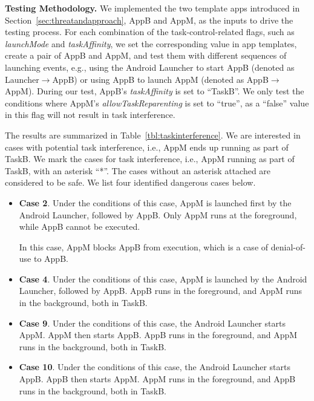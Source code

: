 \documentclass[letterpaper,12pt]{article}
\begin{document}
{\noindent \bf Testing Methodology.} We implemented the two template
apps introduced in Section~\ref{sec:threatandapproach}, AppB and AppM, as the
inputs to drive the testing process.  For each combination of the
task-control-related flags, such as {\em launchMode} and {\em
  taskAffinity}, we set the corresponding value in app templates,
create a pair of AppB and AppM, and test them with different sequences
of launching events, e.g., using the Android Launcher to start AppB
(denoted as Launcher$\rightarrow$AppB) or using AppB to launch AppM
(denoted as AppB$\rightarrow$AppM). During our test, AppB's {\em
  taskAffinity} is set to ``TaskB''.  We only test the conditions
where AppM's {\em allowTaskReparenting} is set to ``true'', as a
``false'' value in this flag will not result in task interference.

The results are summarized in Table~\ref{tbl:taskinterference}.  We
are interested in cases with potential task interference, i.e., AppM
ends up running as part of TaskB.  We mark the cases for task
interference, i.e., AppM running as part of TaskB, with an asterisk
``*''. The cases without an asterisk attached are considered to be
safe. We list four identified dangerous cases below.

\begin{itemize}
  \item {\bf Case 2}. Under the conditions of this case, AppM is
    launched first by the Android Launcher, followed by AppB. Only
    AppM runs at the foreground, while AppB cannot be executed.

    In this case, AppM blocks AppB from execution, which is a case
    of denial-of-use to AppB.
  \item {\bf Case 4}. Under the conditions of this case, AppM is
    launched by the Android Launcher, followed by AppB. AppB runs in
    the foreground, and AppM runs in the background, both in TaskB.
  \item {\bf Case 9}. Under the conditions of this case, the Android
    Launcher starts AppM. AppM then starts AppB. AppB runs in
    the foreground, and AppM runs in the background, both in TaskB.
  \item {\bf Case 10}. Under the conditions of this case, the Android
    Launcher starts AppB. AppB then starts AppM. AppM runs in
    the foreground, and AppB runs in the background, both in TaskB.
\end{itemize}
\end{document}
